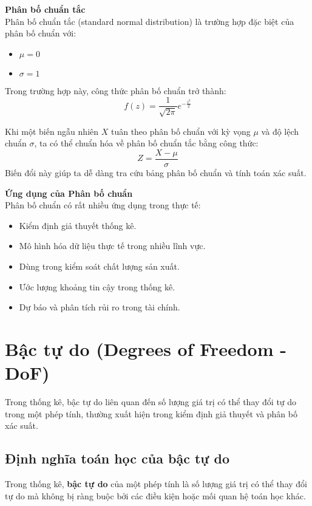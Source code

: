 \noindent \textbf{Phân bố chuẩn tắc}\\
Phân bố chuẩn tắc (standard normal distribution) là trường hợp đặc biệt của phân bố chuẩn với:
\begin{itemize}
    \item $\mu = 0$
    \item $\sigma = 1$
\end{itemize}
Trong trường hợp này, công thức phân bố chuẩn trở thành:
\begin{equation}
    f(z) = \frac{1}{\sqrt{2\pi}} e^{-\frac{z^2}{2}}
\end{equation}

Khi một biến ngẫu nhiên $X$ tuân theo phân bố chuẩn với kỳ vọng $\mu$ và độ lệch chuẩn $\sigma$, ta có thể chuẩn hóa về phân bố chuẩn tắc bằng công thức:
\begin{equation}
    Z = \frac{X - \mu}{\sigma}
\end{equation}
Biến đổi này giúp ta dễ dàng tra cứu bảng phân bố chuẩn và tính toán xác suất.

\noindent \textbf{Ứng dụng của Phân bố chuẩn}\\
Phân bố chuẩn có rất nhiều ứng dụng trong thực tế:
\begin{itemize}
    \item Kiểm định giả thuyết thống kê.
    \item Mô hình hóa dữ liệu thực tế trong nhiều lĩnh vực.
    \item Dùng trong kiểm soát chất lượng sản xuất.
    \item Ước lượng khoảng tin cậy trong thống kê.
    \item Dự báo và phân tích rủi ro trong tài chính.
\end{itemize}

\section{Bậc tự do (Degrees of Freedom - DoF)}
Trong thống kê, bậc tự do liên quan đến số lượng giá trị có thể thay đổi tự do trong một phép tính, thường xuất hiện trong kiểm định giả thuyết và phân bố xác suất.

\subsection{Định nghĩa toán học của bậc tự do}

Trong thống kê, \textbf{bậc tự do} của một phép tính là số lượng giá trị có thể thay đổi tự do mà không bị ràng buộc bởi các điều kiện hoặc mối quan hệ toán học khác.

